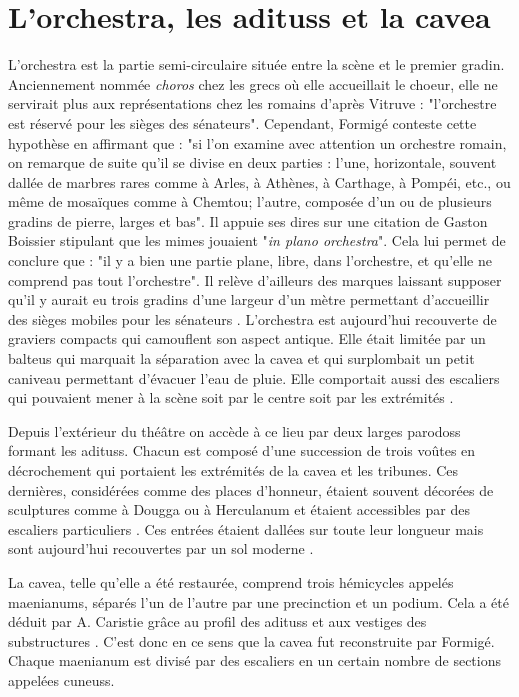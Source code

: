 		
\section{L'\gls{orchestra}, les \glspl{aditus} et la \gls{cavea}}		
	
	L'\gls{orchestra} est la partie semi-circulaire située entre la scène et le premier gradin. Anciennement nommée \textit{choros} chez les grecs où elle accueillait le choeur, elle ne servirait plus aux représentations chez les romains d'après Vitruve \cite[p. 10]{vitruve} : "l'orchestre est réservé pour les sièges des sénateurs". Cependant, Formigé \cite[p. 28-29]{formige} conteste cette hypothèse en affirmant que : "si l'on examine avec attention un orchestre romain, on remarque de suite qu'il se divise en deux parties : l'une, horizontale, souvent dallée de marbres rares comme à Arles, à Athènes, à Carthage, à Pompéi, etc., ou même de mosaïques comme à Chemtou; l'autre, composée d'un ou de plusieurs gradins de pierre, larges et bas". Il appuie ses dires sur une citation de Gaston Boissier \cite[article MIMVS]{boissier} stipulant que les mimes jouaient "\textit{in plano orchestra}". Cela lui permet de conclure que : "il y a bien une partie plane, libre, dans l'orchestre, et qu'elle ne comprend pas tout l'orchestre". Il relève d'ailleurs des marques laissant supposer qu'il y aurait eu trois gradins d'une largeur d'un mètre permettant d'accueillir des sièges mobiles pour les sénateurs \cite[p. 455]{formigeBis}. L'\gls{orchestra} est aujourd'hui recouverte de graviers compacts qui camouflent son aspect antique. Elle était limitée par un \gls{balteus} qui marquait la séparation avec la \gls{cavea} et qui surplombait un petit caniveau permettant d'évacuer l'eau de pluie. Elle comportait aussi des escaliers qui pouvaient mener à la scène soit par le centre soit par les extrémités \citep[p. 52]{formige}.
	
	Depuis l'extérieur du théâtre on accède à ce lieu par deux larges \glspl{parodos} formant les \glspl{aditus}. Chacun est composé d'une succession de trois voûtes en décrochement qui portaient les extrémités de la \gls{cavea} et les tribunes. Ces dernières, considérées comme des places d'honneur, étaient souvent décorées de sculptures comme à Dougga ou à Herculanum et étaient accessibles par des escaliers particuliers \citep[p. 37]{formige}. Ces entrées étaient dallées sur toute leur longueur mais sont aujourd'hui recouvertes par un sol moderne \cite[Pl. XVI]{orangePl}.
	
		La  \gls{cavea}, telle qu'elle a été restaurée, comprend trois hémicycles appelés \glspl{maenianum}, séparés l'un de l'autre par une \gls{precinction} et un \gls{podium}. Cela a été déduit par A. Caristie grâce au profil des \glspl{aditus} et aux vestiges des substructures \cite[p. 340]{orangeTxt}. C'est donc en ce sens que la \gls{cavea} fut reconstruite par Formigé. Chaque \gls{maenianum} est divisé par des escaliers en un certain nombre de sections appelées \glspl{cuneus}.
		
